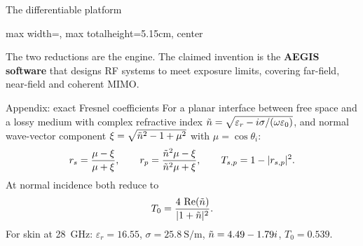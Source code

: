 \documentclass[aspectratio=169, 11pt]{beamer}
\begin{document}
\begin{frame}{The differentiable platform}
\begin{adjustbox}{max width=\linewidth, max totalheight=5.15cm, center}
  \end{adjustbox}

  \vspace{2pt}
  \begin{resultbox}\centering
    \footnotesize The two reductions are the {\color{colpb}engine}. The claimed
    invention is the {\color{navyblue}\bfseries AEGIS software} that designs RF systems
    to meet exposure limits, covering far-field, near-field and coherent MIMO.
  \end{resultbox}
\end{frame}

\appendix

\begin{frame}{Appendix: exact Fresnel coefficients}
  For a planar interface between free space and a lossy medium with complex
  refractive index $\tilde{n}=\sqrt{\varepsilon_r - i\sigma/(\omega\varepsilon_0)}$,
  and normal wave-vector component $\xi=\sqrt{\tilde{n}^2-1+\mu^2}$ with
  $\mu=\cos\theta_i$:
  \begin{equation*}
    r_s = \frac{\mu-\xi}{\mu+\xi}, \qquad
    r_p = \frac{\tilde{n}^2\mu-\xi}{\tilde{n}^2\mu+\xi},\qquad
    T_{s,p} = 1 - |r_{s,p}|^2 .
  \end{equation*}
  At normal incidence both reduce to
  \[
    T_0 = \frac{4\,\operatorname{Re}(\tilde{n})}{|1+\tilde{n}|^2}.
  \]
  For skin at \SI{28}{\giga\hertz}: $\varepsilon_r=16.55$, $\sigma=\SI{25.8}{\siemens\per\metre}$,
  $\tilde{n}=4.49-1.79i$, $T_0=0.539$.
\end{frame}
\end{document}
